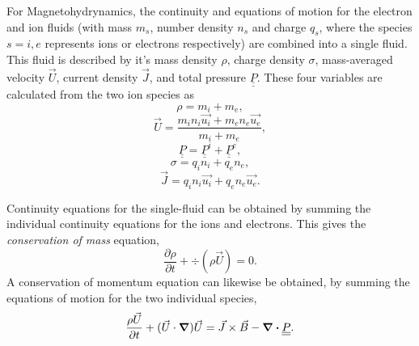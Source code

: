 For Magnetohydrynamics, the continuity and equations of motion for the electron and ion fluids (with mass $m_s$, number density $n_s$ and charge $q_s$, where the species $s = i,e$ represents ions or electrons respectively) are combined into a single fluid. This fluid is described by it's mass density $\rho$, charge density $\sigma$, mass-averaged velocity $\vec{U}$, current density $\vec{J}$, and total pressure $\underline{\underline{P}}$. These four variables are calculated from the two ion species as
\begin{equation} \rho = m_i + m_e,  \end{equation}
\begin{equation} \vec{U} = \frac{m_i n_i \vec{u_i} + m_e n_e \vec{u_e}}{ m_i + m_e},  \end{equation}
\begin{equation} \underline{\underline{P}} = \underline{\underline{P}}^i + \underline{\underline{P}}^e,  \end{equation}
\begin{equation} \sigma = q_i n_i + q_e n_e,  \end{equation}
\begin{equation} \vec{J} = q_i n_i \vec{u_i} + q_e n_e \vec{u_e}.  \end{equation}

Continuity equations for the single-fluid can be obtained by summing the individual continuity equations for the ions and electrons. This gives the \textit{conservation of mass} equation,
\begin{equation} \frac{\partial \rho}{\partial t} + \div (\rho \vec{U}) = 0. \end{equation}
A conservation of momentum equation can likewise be obtained, by summing the equations of motion for the two individual species,
\begin{equation} \frac{\rho \vec{U}}{\partial t} + (\vec{U} \cdot \grad)\vec{U} =\vec{J} \times \vec{B} - \div \underline{\underline{P}} .\end{equation}


